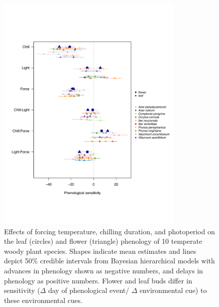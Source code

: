 \documentclass[11pt]{article}\usepackage[]{graphicx}\usepackage[]{color}
\begin{document}
\begin{figure}[h!]
    \centering
         \includegraphics[width=0.8\textwidth]{..//Plots/Flobuds_manuscript_figs/budburstvsflowering.pdf}
         \caption{ Effects of forcing temperature, chilling duration, and photoperiod on the leaf (circles) and flower (triangle) phenology of 10 temperate woody plant species. Shapes indicate mean estimates and lines depict 50\% credible intervals from Bayesian hierarchical models with advances in phenology shown as negative numbers, and delays in phenology as positive numbers. Flower and leaf buds differ in sensitivity ($\Delta$ day of phenological event/ $\Delta$ environmental cue) to these environmental cues.}
    \label{fig:model}
\end{figure}
\end{document}
